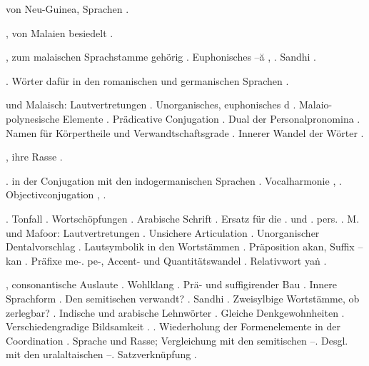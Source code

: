 \begin{register}
 von Neu-Guinea, Sprachen \pageref{sp.280}.

, von Malaien besiedelt \pageref{sp.147}.

, zum malaischen Sprachstamme gehörig \pageref{sp.26}. Euphonisches –ă \pageref{sp.157}, \pageref{sp.435}.  Sandhi \pageref{sp.198}.

. Wörter dafür in den romanischen und germanischen Sprachen \pageref{sp.153}.

 und Malaisch: Lautvertretungen \pageref{sp.158}. Unorganisches, euphonisches d \pageref{sp.201}. Malaio-polynesische Elemente \pageref{sp.280}. Prädicative Conjugation \pageref{sp.391}. Dual der Personalpronomina \pageref{sp.409}. Namen für Körpertheile und Verwandtschaftsgrade \pageref{sp.441}. Innerer Wandel der Wörter \pageref{sp.443}.


, ihre Rasse \pageref{sp.147}. 

.  in der Conjugation mit den indogermanischen Sprachen \pageref{sp.153}. Vocalharmonie \pageref{sp.350}, \pageref{sp.403}. Objectivconjugation \pageref{sp.384}, \pageref{sp.391}. 


. Tonfall \pageref{sp.34}. Wortschöpfungen \pageref{sp.42}. Arabische Schrift \pageref{sp.129}. Ersatz für die  \pageref{sp.1}. und \pageref{sp.2}. pers. \pageref{sp.152}. M. und Mafoor: Lautvertretungen \pageref{sp.158}. Unsichere Articulation \pageref{sp.193}. Unorganischer Dentalvorschlag \pageref{sp.201}. Lautsymbolik in den Wortstämmen \pageref{sp.223}. Präposition akan, Suffix –kan \pageref{sp.348}. Präfixe me-. pe-, Accent- und Quantitätswandel \pageref{sp.350}. Relativwort yaṅ \pageref{sp.457}.

, consonantische Auslaute \pageref{sp.29}. Wohlklang \pageref{sp.34}.   Prä- und suffigirender Bau \pageref{sp.149}. Innere Sprachform \pageref{sp.150}. Den semitischen verwandt? \pageref{sp.162}. Sandhi \pageref{sp.199}. Zweisylbige Wortstämme, ob zerlegbar? \pageref{sp.242}. Indische und arabische Lehnwörter \pageref{sp.266}. Gleiche Denkgewohnheiten \pageref{sp.293}. Verschiedengradige Bildsamkeit \pageref{sp.349}.  \pageref{sp.384}. Wiederholung der Formenelemente in der Coordination \pageref{sp.400}. Sprache und Rasse; Vergleichung mit den semitischen \pageref{sp.411}–\pageref{sp.415}. Desgl. mit den uralaltaischen \pageref{sp.415}–\pageref{sp.420}. Satzverknüpfung \pageref{sp.465}.


\end{register}
